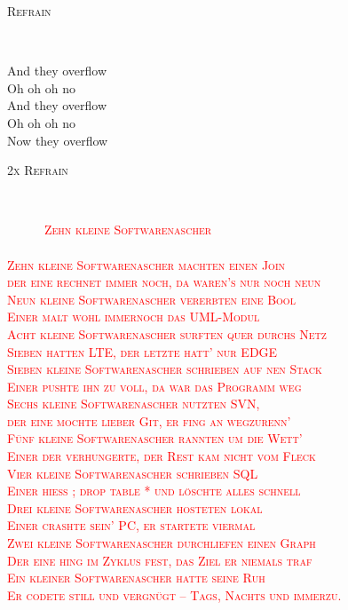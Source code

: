 \documentclass[11pt,a5paper]{article}
\newcommand\colorjoke{red}
\newcommand\refrain[1]{\begin{tcolorbox}#1\end{tcolorbox} \ }
\newcommand{\refrefrain}{\refrain{\textsc{Refrain}} \ }
\newcommand{\refrefraintwice}{\refrain{\textsc{2x Refrain}} \ }
\newcommand\joke[1]{\textcolor{\colorjoke}{\textsc{#1}}}
\begin{document}
\refrefrain

And they overflow \\
Oh oh oh no \\
And they overflow \\
Oh oh oh no \\
Now they overflow \\

\refrefraintwice
	
	\vspace*{3cm}

		\joke{\ \ \ \ \ \ Zehn kleine Softwarenascher \\
			\ \\
			Zehn kleine Softwarenascher machten einen Join \\
			der eine rechnet immer noch, da waren's nur noch neun \\
			Neun kleine Softwarenascher vererbten eine Bool \\
			Einer malt wohl immernoch das UML-Modul \\
			Acht kleine Softwarenascher surften quer durchs Netz \\
			Sieben hatten LTE, der letzte hatt' nur EDGE \\
			Sieben kleine Softwarenascher schrieben auf nen Stack \\
			Einer pushte ihn zu voll, da war das Programm weg \\
			Sechs kleine Softwarenascher nutzten SVN, \\
			der eine mochte lieber Git, er fing an wegzurenn' \\
			Fünf kleine Softwarenascher rannten um die Wett' \\
			Einer der verhungerte, der Rest kam nicht vom Fleck \\
			Vier kleine Softwarenascher schrieben SQL \\
			Einer hieß ; drop table * und löschte alles schnell \\
			Drei kleine Softwarenascher hosteten lokal \\
			Einer crashte sein' PC, er startete viermal \\
			Zwei kleine Softwarenascher durchliefen einen Graph \\
			Der eine hing im Zyklus fest, das Ziel er niemals traf \\
			Ein kleiner Softwarenascher hatte seine Ruh \\
			Er codete still und vergnügt -- Tags, Nachts und immerzu.}	

\pagebreak
\end{document}
